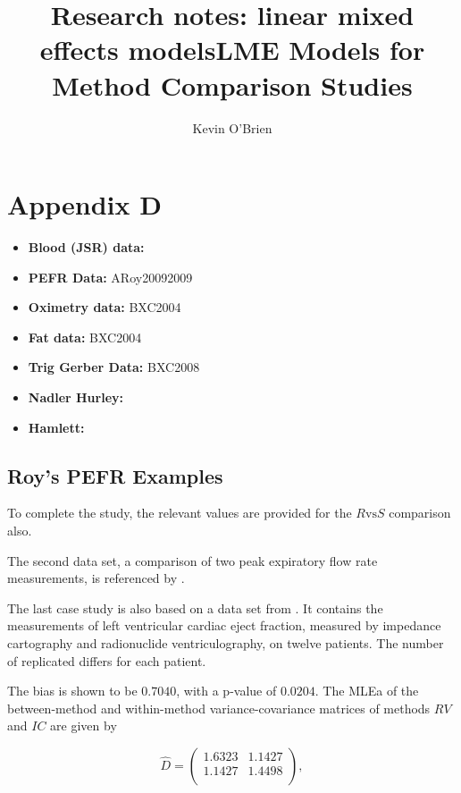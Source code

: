 \documentclass[12pt, a4paper]{report}
\title{Research notes: linear mixed effects models}
\author{ } \date{ }
\theoremstyle{plain}
\theoremstyle{definition}
\theoremstyle{remark}
\begin{document}
\author{Kevin O'Brien}
\title{LME Models for Method Comparison Studies}

\chapter{Appendix D}

\begin{itemize}
\item \textbf{Blood (JSR) data:} 
\item \textbf{PEFR Data:} ARoy20092009
\item \textbf{Oximetry data:} BXC2004
\item \textbf{Fat data:} BXC2004
\item \textbf{Trig Gerber Data:} BXC2008
\item \textbf{Nadler Hurley:}
\item \textbf{Hamlett:}
\end{itemize}




\section{Roy's PEFR Examples}



To complete the study, the relevant values are provided for the $R \mbox{vs} S$ comparison also.


The second data set, a comparison of two peak expiratory flow rate measurements, is referenced by \citet{BA86}.


The last case study is also based on a data set from  \citet{BA99}. It contains the measurements of left ventricular cardiac eject fraction, measured by impedance cartography and radionuclide ventriculography, on twelve patients.
The number of replicated differs for each patient.

The bias is shown to be $0.7040$, with a p-value of $0.0204$. The MLEa of the between-method and within-method variance-covariance matrices of methods $RV$ and $IC$ are given by

\begin{equation}\hat{D}=\left(
\begin{array}{cc}
1.6323 & 1.1427 \\
1.1427 & 1.4498 \\
\end{array}
\right),
\end{equation}
\end{document}
